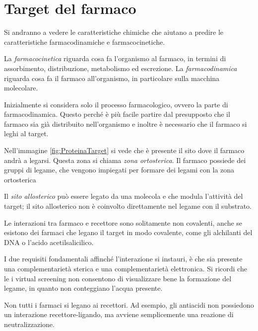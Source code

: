\chapter{Target del farmaco}

Si andranno a vedere le caratteristiche chimiche che aiutano a predire
le caratteristiche farmacodinamiche e farmacocinetiche.

La \emph{farmacocinetica} riguarda cosa fa l'organismo al farmaco, in
termini di assorbimento, distribuzione, metabolismo ed escrezione. La
\emph{farmacodinamica} riguarda cosa fa il farmaco all'organismo, in
particolare sulla macchina molecolare.

Inizialmente si considera solo il processo farmacologico, ovvero la
parte di farmacodinamica. Questo perché è più facile partire dal
presupposto che il farmaco sia già distribuito nell'organismo e inoltre
è necessario che il farmaco si leghi al target.


Nell'immagine {}\ref{fig:ProteinaTarget} si vede che è presente il sito
dove il farmaco andrà a legarsi. Questa zona si chiama \emph{zona
ortosterica}. Il farmaco possiede dei gruppi di legame, che vengono
impiegati per formare dei legami con la zona ortosterica

Il \emph{sito allosterico} può essere legato da una molecola e che
modula l'attività del target; il sito allosterico non è coinvolto
direttamente nel legame con il substrato.

Le interazioni tra farmaco e recettore sono solitamente non covalenti,
anche se esistono dei farmaci che legano il target in modo covalente,
come gli alchilanti del DNA o l'acido acetilsalicilico.

I due requisiti fondamentali affinché l'interazione si instauri, è che
sia presente una complementarietà sterica e una complementarietà
elettronica. Si ricordi che le i virtual screening non consentono di
visualizzare bene la formazione del
legame,
in quanto non conteggiano l'acqua presente.

Non tutti i farmaci si legano ai recettori. Ad esempio, gli antiacidi
non possiedono un interazione recettore-ligando, ma avviene
semplicemente una reazione di neutralizzazione.


